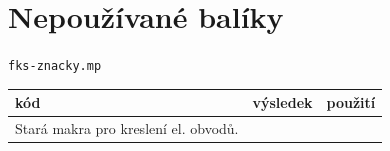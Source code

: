 \documentclass[a4paper,10pt]{article}
\begin{document}
\section{Nepoužívané balíky}
{\centering\large\texttt{fks-znacky.mp}\nopagebreak\\\vspace{-12pt}\noindent}
\begin{tabularx}{\textwidth}{|l|l|X|}\hline
    kód & výsledek & použití\\\hline
    Stará makra pro kreslení el. obvodů.&&
{} {} {} {} {} {} {} {} {} {} {} {} {} {} {} {} {} {} {} {} {} {} {} {} {} {} {} {} {} {} {} {} {} {} {} {} {} {} {} {} {} {} {} {} {} {} {} {} {} {} {} {} {} {} {} {} {} {} {} {} {} {} {} {} {} {} {} {} {} {} {} {} {} {} {} {} {} {} {} {} {} {} {} {} {} {} {} {} {} {} {} {} {} {} {} {} {} {} {} {} {} {} {} {} {} {} {} {} {} {} {} {} {} {} {} {} {} {} {} {} {} {} {} {} {} {} {} {}
\\\hline
\end{tabularx}\bigskip
\end{document}
